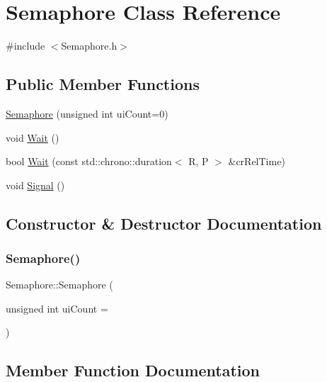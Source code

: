 \hypertarget{class_semaphore}{}\section{Semaphore Class Reference}
\label{class_semaphore}


{\ttfamily \#include $<$Semaphore.\+h$>$}

\subsection*{Public Member Functions}
\begin{DoxyCompactItemize}
\item 
\hyperlink{class_semaphore_a0d9290d316636875ca85d1d78950a817}{Semaphore} (unsigned int ui\+Count=0)
\item 
void \hyperlink{class_semaphore_a72aabebf026e3a8b1f3e4d0fa8ee1eda}{Wait} ()
\item 
bool \hyperlink{class_semaphore_a4633191100ac04557620cbb4714b4865}{Wait} (const std\+::chrono\+::duration$<$ R, P $>$ \&cr\+Rel\+Time)
\item 
void \hyperlink{class_semaphore_a86f92f738b4486439b296d8e235895f2}{Signal} ()
\end{DoxyCompactItemize}


\subsection{Constructor \& Destructor Documentation}
\mbox{\label{class_semaphore_a0d9290d316636875ca85d1d78950a817}} 
\subsubsection{\texorpdfstring{Semaphore()}{Semaphore()}}
{\footnotesize\ttfamily Semaphore\+::\+Semaphore (\begin{DoxyParamCaption}\item[{unsigned int}]{ui\+Count = {} }\end{DoxyParamCaption})\hspace{0.3cm}{\ttfamily [inline]}}



\subsection{Member Function Documentation}
\mbox{\label{class_semaphore_a86f92f738b4486439b296d8e235895f2}} 
